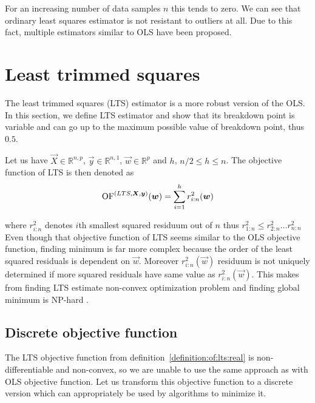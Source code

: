 
For an increasing number of data samples $n$ this tends to zero. We can see that ordinary least squares estimator is not resistant to outliers at all. Due to this fact, multiple estimators similar to OLS have been proposed.




\section{Least trimmed squares}
The least trimmed squares (LTS) estimator is a more robust version of the OLS. In this section, we define LTS estimator and show that its breakdown point is variable and can go up to the maximum possible value of breakdown point, thus~$0.5$.

\begin{definition} \label{definition:of:lts:real}
Let us have $\vec{X} \in \mathbb{R}^{n,p}$, $\vec{y} \in \mathbb{R}^{n,1}$, 
    $\vec{w} \in \mathbb{R}^p$ and $h$, $ n/2 \leq h \leq n$. The objective function of LTS is then denoted as 
    \begin{equation}  
        \operatorname{OF}^{(LTS,\boldsymbol{X}, \boldsymbol{y})}(\boldsymbol{w}) =  \sum\limits_{i=1}^h r_{i:n}^2(\boldsymbol{w})  
    \end{equation}
\end{definition}
where $r_{i:n}^2$ denotes $i$th smallest squared residuum out of $n$ thus $r_{1:n}^2 \leq r_{2:n}^2 \ldots r_{n:n}^2$
Even though that objective function of LTS seems similar to the OLS objective function, finding minimum is far more complex because the order of the least squared residuals is dependent on $\vec{w}$. Moreover  $r_{i:n}^2(\vec{w})$ residuum is not uniquely determined if more squared residuals have same value as $r_{i:n}^2(\vec{w})$. This makes from finding LTS estimate non-convex optimization problem and finding global minimum is NP-hard \cite{bernholt2006robust}. 

\subsection{Discrete objective function}
The LTS objective function from definition~\ref{definition:of:lts:real} is non-differentiable and non-convex, so we are unable to use the same approach as with OLS objective function. Let us transform this objective function to a discrete version which can appropriately be used by algorithms to minimize it.

